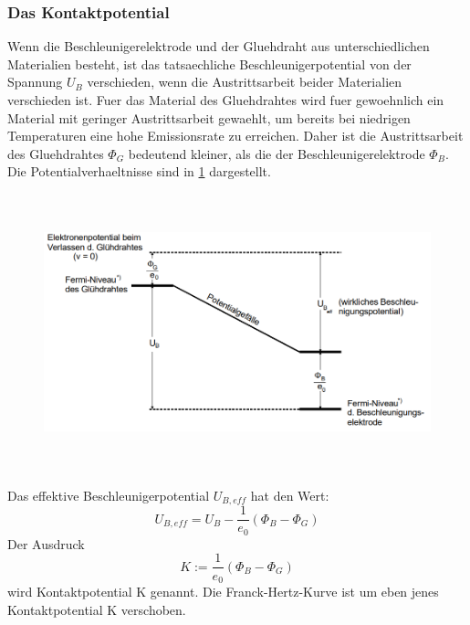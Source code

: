 \documentclass[titlepage=firstcover, captions=tableheading]{scrartcl}
\begin{document}
\subsubsection{Das Kontaktpotential}
Wenn die Beschleunigerelektrode und der Gluehdraht aus unterschiedlichen Materialien besteht, ist das tatsaechliche Beschleunigerpotential von der Spannung $U_B$ verschieden, wenn die Austrittsarbeit beider Materialien verschieden ist. Fuer das Material des Gluehdrahtes wird fuer gewoehnlich ein Material mit geringer Austrittsarbeit gewaehlt, um bereits bei niedrigen Temperaturen eine hohe Emissionsrate zu erreichen. Daher ist die Austrittsarbeit des Gluehdrahtes $\Phi_G$ bedeutend kleiner, als die der Beschleunigerelektrode $\Phi_B$. Die Potentialverhaeltnisse sind in \ref{Fig:Potential} dargestellt.
\begin{figure}[H]
    \centering
    \captionsetup{justification=centering}
    \includegraphics[height=8cm]{"Potential_FranckHertz.png"}
    \label{Fig:Potential}
\end{figure}
\noindent Das effektive Beschleunigerpotential $U_{B, eff}$ hat den Wert:
\begin{equation}
    U_{B,eff}=U_B-\frac{1}{e_0}(\Phi_B-\Phi_G)\nonumber
\end{equation}
Der Ausdruck 
\begin{equation}
    K:=\frac{1}{e_0}(\Phi_B-\Phi_G)\nonumber
\end{equation}
wird Kontaktpotential K genannt. Die Franck-Hertz-Kurve ist um eben jenes Kontaktpotential K verschoben.
\end{document}
